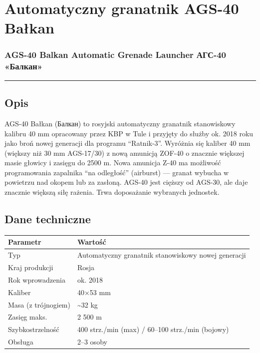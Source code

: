 \documentclass[12pt,openany,oneside]{book}
\begin{document}
\chapter{Automatyczny granatnik AGS-40
Bałkan}\label{automatyczny-granatnik-ags-40-baux142kan}

\subsection{AGS-40 Balkan Automatic Grenade Launcher \textbar{} АГС-40
«Балкан»}\label{ags-40-balkan-automatic-grenade-launcher-ux430ux433ux441-40-ux431ux430ux43bux43aux430ux43d}

\begin{center}\rule{0.5\linewidth}{0.5pt}\end{center}

\section{Opis}\label{opis-84}

AGS-40 Bałkan (Балкан) to rosyjski automatyczny granatnik stanowiskowy
kalibru 40 mm opracowany przez KBP w Tule i przyjęty do służby ok. 2018
roku jako broń nowej generacji dla programu ``Ratnik-3''. Wyróżnia się
kaliber 40 mm (większy niż 30 mm AGS-17/30) z nową amunicją ZOF-40 o
znacznie większej masie głowicy i zasięgu do 2500 m. Nowa amunicja Z-40
ma możliwość programowania zapalnika ``na odległość'' (airburst) ---
granat wybucha w powietrzu nad okopem lub za zasłoną. AGS-40 jest
cięższy od AGS-30, ale daje znacznie większą siłę rażenia. Trwa
doposażanie wybranych jednostek.

\section{Dane techniczne}\label{dane-techniczne-84}

\begin{longtable}[]{@{}ll@{}}
\toprule\noalign{}
Parametr & Wartość \\
\midrule\noalign{}
\endhead
\bottomrule\noalign{}
\endlastfoot
Typ & Automatyczny granatnik stanowiskowy nowej generacji \\
Kraj produkcji & Rosja \\
Rok wprowadzenia & ok. 2018 \\
Kaliber & 40×53 mm \\
Masa (z trójnogiem) & \textasciitilde32 kg \\
Zasięg maks. & 2 500 m \\
Szybkostrzelność & 400 strz./min (max) / 60--100 strz./min (bojowy) \\
Obsługa & 2--3 osoby \\
\end{longtable}
\end{document}
